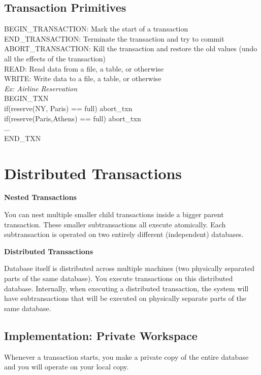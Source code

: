 \documentclass[twoside]{article}
\begin{document}
\subsection{Transaction Primitives}

BEGIN\_TRANSACTION: Mark the start of a transaction\\
END\_TRANSACTION: Terminate the transaction and try to commit\\
ABORT\_TRANSACTION:  Kill the transaction and restore the old values (undo all the effects of the transaction)\\
READ:  Read data from a file, a table, or otherwise\\
WRITE: Write data to a file, a table, or otherwise\\

\emph{Ex: Airline Reservation}\\
BEGIN\_TXN\\
  if(reserve(NY, Paris) == full) abort\_txn\\
  if(reserve(Paris,Athens) == full) abort\_txn\\
  ...\\
END\_TXN\\


\section{Distributed Transactions}

\textbf{Nested Transactions}

You can nest multiple smaller child transactions inside a bigger parent transaction. These smaller subtransactions all execute atomically. Each subtransaction is operated on two entirely different (independent) databases.

\textbf{Distributed Transactions}

Database itself is distributed across multiple machines (two physically separated parts of the same database). You execute transactions on this distributed database. Internally, when executing a distributed transaction, the system will have subtransactions that will be executed on physically separate parts of the same database.

\subsection{Implementation: Private Workspace}

Whenever a transaction starts, you make a private copy of the entire database and you will operate on your local copy.
\end{document}
